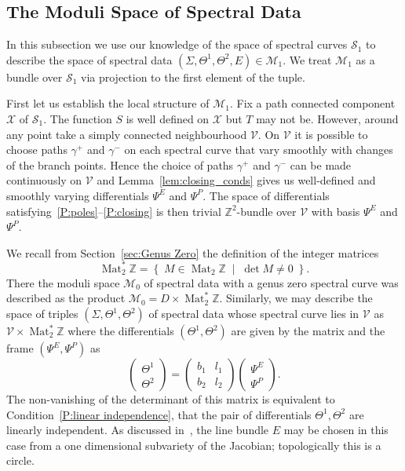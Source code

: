 \documentclass{article}
\numberwithin{equation}{section}
\numberwithin{figure}{section}
\newcommand{\Set}[2]{\left\{\; #1 \;\middle|\; #2 \;\right\}}
\DeclareMathOperator{\Mat}{Mat}
\newcommand{\Z}{\mathbb{Z}}
\begin{document}

\subsection{The Moduli Space of Spectral Data}
In this subsection we use our knowledge of the space of spectral curves $\mathcal{S}_1$ to describe the space of spectral data $(\Sigma,\Theta^1,\Theta^2,E)\in\mathcal{M}_1$. We treat $\mathcal{M}_1$ as a bundle over $\mathcal{S}_1$ via projection to the first element of the tuple.

First let us establish the local structure of $\mathcal{M}_1$. 
Fix a path connected component $\mathcal{X}$ of $\mathcal{S}_1$.
The function $S$ is well defined on $\mathcal{X}$ but $T$ may not be. 
However, around any point take a simply connected neighbourhood $\mathcal{V}$. On $\mathcal{V}$ it is possible to choose paths $\gamma^+$ and $\gamma^-$ on each spectral curve that vary smoothly with changes of the branch points. Hence the choice of paths $\gamma^+$ and $\gamma^-$ can be made continuously on $\mathcal{V}$ and Lemma~\ref{lem:closing_conds} gives us well-defined and smoothly varying differentials $\Psi^E$ and $\Psi^P$. The space of differentials satisfying~\ref{P:poles}--\ref{P:closing} is then trivial $\Z^2$-bundle over $\mathcal{V}$ with basis $\Psi^E$ and $\Psi^P$.

We recall from Section~\ref{sec:Genus Zero} the definition of the integer matrices 
\[
\Mat_2^*\Z = \Set{ M \in \Mat_2\Z }{\det M \neq 0}. 
\]
There the moduli space $\mathcal{M}_0$ of spectral data with a genus zero spectral curve was described as the product $\mathcal{M}_0 = D \times \Mat_2^*\Z$. Similarly, we may describe the space of triples $(\Sigma,\Theta^1,\Theta^2)$ of spectral data whose spectral curve lies in $\mathcal{V}$ as $\mathcal{V} \times \Mat_2^*\Z$ where the differentials $(\Theta^1,\Theta^2)$ are given by the matrix and the frame $(\Psi^E,\Psi^P)$ as
\[
\begin{pmatrix}
\Theta^1 \\ \Theta^2
\end{pmatrix}
=
\begin{pmatrix}
b_1 & l_1 \\
b_2 & l_2
\end{pmatrix}
\begin{pmatrix}
\Psi^E \\ \Psi^P
\end{pmatrix}.
\]
The non-vanishing of the determinant of this matrix is equivalent to Condition~\ref{P:linear independence}, that the pair of differentials $\Theta^1, \Theta^2$ are linearly independent. As discussed in~\cite[p.~690]{Hitchin1990}, the line bundle $E$ may be chosen in this case from a one dimensional subvariety of the Jacobian; topologically this is a circle.
\end{document}
